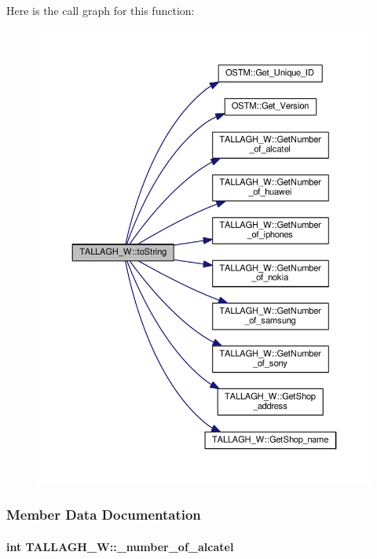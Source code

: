Here is the call graph for this function\+:\nopagebreak
\begin{figure}[H]
\begin{center}
\leavevmode
\includegraphics[width=350pt]{class_t_a_l_l_a_g_h___w_ac7a438b7511cf2931490e6b44eff4a49_ac7a438b7511cf2931490e6b44eff4a49_cgraph}
\end{center}
\end{figure}




\subsubsection{Member Data Documentation}
\paragraph[{\texorpdfstring{\+\_\+number\+\_\+of\+\_\+alcatel}{_number_of_alcatel}}]{\setlength{\rightskip}{0pt plus 5cm}int T\+A\+L\+L\+A\+G\+H\+\_\+\+W\+::\+\_\+number\+\_\+of\+\_\+alcatel\hspace{0.3cm}{\ttfamily [private]}}\hypertarget{class_t_a_l_l_a_g_h___w_a034f2ba8c42c1b81ae947b15732e5881_a034f2ba8c42c1b81ae947b15732e5881}{}\label{class_t_a_l_l_a_g_h___w_a034f2ba8c42c1b81ae947b15732e5881_a034f2ba8c42c1b81ae947b15732e5881}


